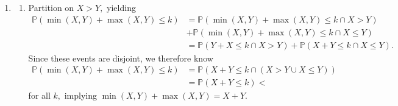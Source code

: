 \documentclass[12pt]{article}
\begin{document}
\begin{enumerate}
\begin{enumerate}
        Substituting, we get
        $$
        \Cov{X}{Y} = \mathbb E[XY] - \mathbb E[X] \mathbb E[Y] =
        \mathbb E\left[\sum_{k = 1}^{n}\sum_{j = 1}^{n} X_i
        Y_j\right] - \sum_{k = 1}^{n} \sum_{j = 1}^{n} \mathbb E[X_k]
        \mathbb E[Y_j].
        $$
        Since $X_i$ and $Y_j$ are independent when $i \neq j,$ we can write
        \begin{align*}
          \Cov{X}{Y} &= \sum_{k = 1}^{n} \sum_{j = 1}^{n} \mathbb
          E[X_i Y_j] - \mathbb E[X_k] \mathbb E[Y_j] \\
          &= \sum_{k = 1}^{n} \mathbb E[X_k Y_k] - \mathbb E[X_k]
          \mathbb E[Y_k] = \sum_{k = 1}^{n}\Cov{X_k}{Y_k}
        \end{align*}
        as required.

      \item Let $X_k$ be the number of points scored by player $A$ in
        game $k,$ and equivalently for $Y_k.$ Then, $X_i$ and $Y_j$
        are independent whenever $i \neq j,$ meaning if $A = X_1 +
        \ldots + X_n$ and $B = Y_1 + \ldots + Y_n,$ we have
        \begin{align*}
          \Cov{A}{B} &= \sum_{i = 1}^{n} \Cov{X_i}{Y_i} \\
          &= \sum_{i = 1}^{n} 2pq - (2p^2 + 2pq)(2q^2 + 2pq) \\
          &= \sum_{i = 1}^{n} 2pq - 4pq = -2npq
        \end{align*}
        as required.
    \end{enumerate}

  \item
    \begin{enumerate}

      \item Partition on $X > Y,$ yielding
        \begin{align*}
          \mathbb P(\min(X, Y) + \max(X, Y) \leq k) &= \mathbb P(
          \min(X, Y) + \max(X, Y) \leq k \cap {X > Y})  \\
          &+ \mathbb P( \min(X, Y) + \max(X, Y) \leq k \cap {X \leq Y}) \\
          &= \mathbb P(Y + X\leq k \cap X > Y) + \mathbb P(X + Y \leq
          k \cap X \leq Y).
        \end{align*}
        Since these events are disjoint, we therefore know
        \begin{align*}
          \mathbb P(\min(X, Y) + \max(X, Y) \leq k) &= \mathbb P(X +
          Y \leq k \cap (X > Y \cup X \leq Y)) \\
          &= \mathbb P(X + Y \leq k)<
        \end{align*}
        for all $k,$ implying $\min(X, Y) + \max(X, Y) = X + Y.$


\end{enumerate}
\end{enumerate}
\end{document}
